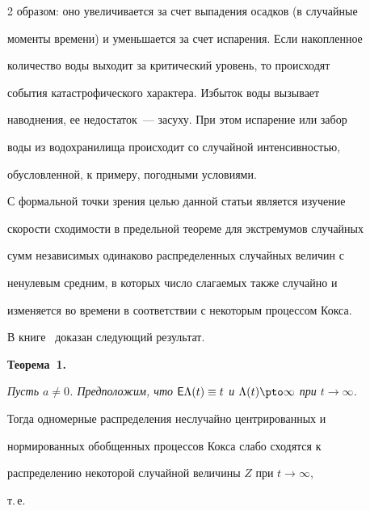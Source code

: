\begin{multicols}{2}
образом: оно увеличивается за счет выпадения осадков (в случайные


моменты времени) и уменьшается за счет испарения. Если накопленное


количество воды выходит за критический уровень, то происходят


события катастрофического характера. Избыток воды вызывает


наводнения, ее недостаток~--- засуху. При этом испарение или забор


воды из водохранилища происходит со случайной интенсивностью,


обусловленной, к примеру, погодными условиями.





\smallskip





С формальной точки зрения целью данной \mbox{статьи} является изучение


скорости сходимости в предельной теореме для экстремумов случайных


сумм независимых одинаково распределенных случайных величин с


ненулевым средним, в которых число слагаемых также случайно и


изменяется во времени в соответствии с некоторым процессом Кокса.





В книге~\cite{1a} доказан следующий результат.





\smallskip





\noindent


\textbf{Теорема~1.} {\it Пусть $a\neq0$. Предположим, что ${\sf


E}\Lambda(t) \equiv t$ и $\Lambda(t)\pto\infty$ при $t\to\infty$.


Тогда одномерные распределения неслучайно центрированных и


нормированных обобщенных процессов Кокса слабо сходятся к


распределению некоторой случайной величины $Z$ при $t\to\infty$,


т.\,е.\


$$


\Longrightarrow


}
\end{multicols}
